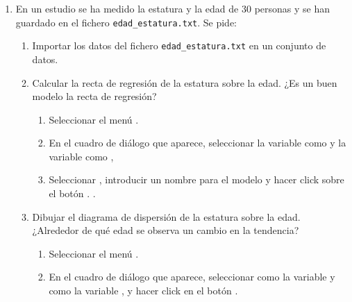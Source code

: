 \begin{enumerate}[leftmargin=*]
\item En un estudio se ha medido la estatura y la edad de 30 personas y se han guardado en el fichero
\texttt{edad\_estatura.txt}.
Se pide:
\begin{enumerate}
\item Importar los datos del fichero \texttt{edad\_estatura.txt} en un conjunto de datos.

\item Calcular la recta de regresión de la estatura sobre la edad. ¿Es un buen modelo la recta de regresión?
\begin{indicacion}{
\begin{enumerate}
\item Seleccionar el menú .
\item En el cuadro de diálogo que aparece, seleccionar la variable  como 
y la variable  como , 
\item Seleccionar , introducir un nombre para el modelo y hacer click sobre el botón .
.
\end{enumerate}}
\end{indicacion}

\item Dibujar el diagrama de dispersión de la estatura sobre la edad. 
¿Alrededor de qué edad se observa un cambio en la tendencia? 
\begin{indicacion}{
\begin{enumerate}
\item Seleccionar el menú .
\item En el cuadro de diálogo que aparece, seleccionar como  la variable  y como
 la variable , y hacer click en el botón .
\end{enumerate}}
\end{indicacion}


\end{enumerate}
\end{enumerate}
